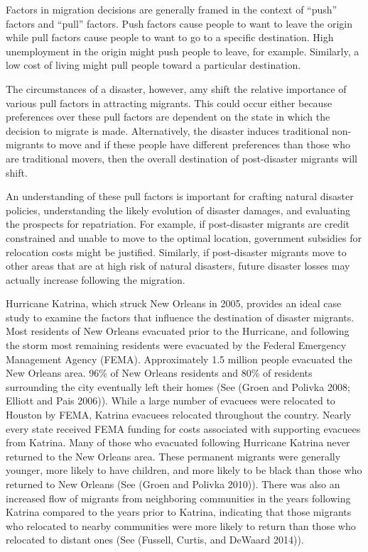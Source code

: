 \documentclass[]{article}
\begin{document}
Factors in migration decisions are generally framed in the context of
``push'' factors and ``pull'' factors. Push factors cause people to want
to leave the origin while pull factors cause people to want to go to a
specific destination. High unemployment in the origin might push people
to leave, for example. Similarly, a low cost of living might pull people
toward a particular destination.

The circumstances of a disaster, however, amy shift the relative
importance of various pull factors in attracting migrants. This could
occur either because preferences over these pull factors are dependent
on the state in which the decision to migrate is made. Alternatively,
the disaster induces traditional non-migrants to move and if these
people have different preferences than those who are traditional movers,
then the overall destination of post-disaster migrants will shift.

An understanding of these pull factors is important for crafting natural
disaster policies, understanding the likely evolution of disaster
damages, and evaluating the prospects for repatriation. For example, if
post-disaster migrants are credit constrained and unable to move to the
optimal location, government subsidies for relocation costs might be
justified. Similarly, if post-disaster migrants move to other areas that
are at high risk of natural disasters, future disaster losses may
actually increase following the migration.

Hurricane Katrina, which struck New Orleans in 2005, provides an ideal
case study to examine the factors that influence the destination of
disaster migrants. Most residents of New Orleans evacuated prior to the
Hurricane, and following the storm most remaining residents were
evacuated by the Federal Emergency Management Agency (FEMA).
Approximately 1.5 million people evacuated the New Orleans area. 96\% of
New Orleans residents and 80\% of residents surrounding the city
eventually left their homes (See (Groen and Polivka 2008; Elliott and
Pais 2006)). While a large number of evacuees were relocated to Houston
by FEMA, Katrina evacuees relocated throughout the country. Nearly every
state received FEMA funding for costs associated with supporting
evacuees from Katrina. Many of those who evacuated following Hurricane
Katrina never returned to the New Orleans area. These permanent migrants
were generally younger, more likely to have children, and more likely to
be black than those who returned to New Orleans (See (Groen and Polivka
2010)). There was also an increased flow of migrants from neighboring
communities in the years following Katrina compared to the years prior
to Katrina, indicating that those migrants who relocated to nearby
communities were more likely to return than those who relocated to
distant ones (See (Fussell, Curtis, and DeWaard 2014)).
\end{document}

